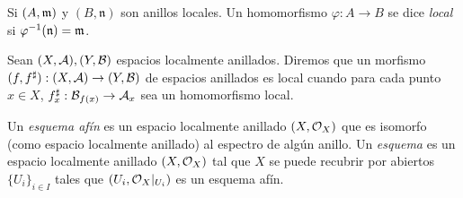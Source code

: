 \documentclass[GA.tex]{subfiles}
\begin{document}
\begin{defi}
Si $(A, {\mathfrak{m}})$ y $(B,\mathfrak{n})$ son anillos locales. Un homomorfismo $\varphi:A\to B$ se dice \emph{local} si $\varphi^{-1}(\mathfrak{n})={\mathfrak{m}}$. 
\end{defi}

\begin{defi}
Sean $(X,\mathcal{A}), (Y,\mathcal{B})$ espacios localmente anillados. Diremos que un morfismo $(f,f^{\sharp}):(X,\mathcal{A})\to (Y,\mathcal{B})$ de espacios anillados es local cuando para cada punto $x\in X$, $f^{\sharp}_x:\mathcal{B}_{f(x)}\to\mathcal{A}_x$ sea un homomorfismo local. 
\end{defi}

\begin{defi}
Un \emph{esquema afín} es un espacio localmente anillado $(X,{\mathcal O}_X)$ que es isomorfo (como espacio localmente anillado) al espectro de algún anillo. Un \emph{esquema} es un espacio localmente anillado $(X,{\mathcal O}_X)$ tal que $X$ se puede recubrir por abiertos $\{U_i\}_{i\in I}$ tales que $(U_i,{\mathcal O}_X|_{U_i})$ es un esquema afín. 
\end{defi}
\end{document}
